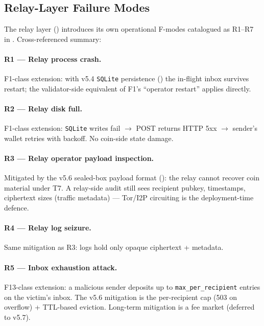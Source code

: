 \subsection{Relay-Layer Failure Modes}
\label{sec:failure-relay}

The relay layer () introduces its own operational
F-modes catalogued as R1--R7 in .
Cross-referenced summary:

\paragraph{R1 --- Relay process crash.} F1-class extension: with
v5.4 \texttt{SQLite} persistence () the
in-flight inbox survives restart; the validator-side equivalent of
F1's ``operator restart'' applies directly.

\paragraph{R2 --- Relay disk full.} F1-class extension: \texttt{SQLite}
writes fail $\to$ POST returns HTTP 5xx $\to$ sender's wallet
retries with backoff. No coin-side state damage.

\paragraph{R3 --- Relay operator payload inspection.} Mitigated by
the v5.6 sealed-box payload format ():
the relay cannot recover coin material under T7. A relay-side audit
still sees recipient pubkey, timestamps, ciphertext sizes (traffic
metadata) — Tor/I2P circuiting is the deployment-time defence.

\paragraph{R4 --- Relay log seizure.} Same mitigation as R3: logs
hold only opaque ciphertext + metadata.

\paragraph{R5 --- Inbox exhaustion attack.} F13-class extension: a
malicious sender deposits up to \texttt{max\_per\_recipient} entries
on the victim's inbox. The v5.6 mitigation is the per-recipient cap
(503 on overflow) + TTL-based eviction. Long-term mitigation is a
fee market (deferred to v5.7).

